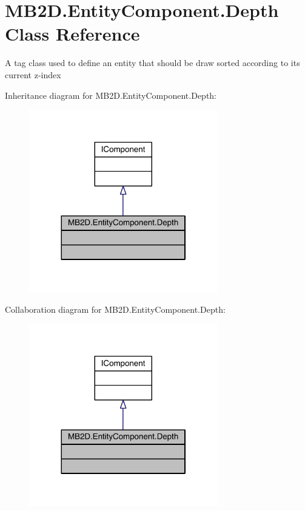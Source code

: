 \hypertarget{class_m_b2_d_1_1_entity_component_1_1_depth}{}\section{M\+B2\+D.\+Entity\+Component.\+Depth Class Reference}
\label{class_m_b2_d_1_1_entity_component_1_1_depth}


A tag class used to define an entity that should be draw sorted according to its current z-\/index  




Inheritance diagram for M\+B2\+D.\+Entity\+Component.\+Depth\+:
\nopagebreak
\begin{figure}[H]
\begin{center}
\leavevmode
\includegraphics[width=233pt]{class_m_b2_d_1_1_entity_component_1_1_depth__inherit__graph}
\end{center}
\end{figure}


Collaboration diagram for M\+B2\+D.\+Entity\+Component.\+Depth\+:
\nopagebreak
\begin{figure}[H]
\begin{center}
\leavevmode
\includegraphics[width=233pt]{class_m_b2_d_1_1_entity_component_1_1_depth__coll__graph}
\end{center}
\end{figure}


